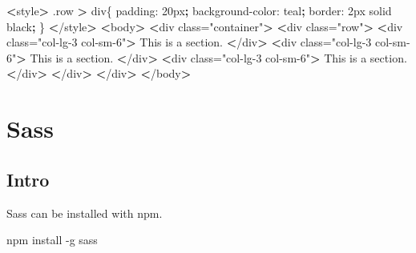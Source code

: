 \documentclass[]{book}
\newenvironment{Shaded}{\begin{snugshade}}{\end{snugshade}}
\newcommand{\ExtensionTok}[1]{#1}
\newcommand{\KeywordTok}[1]{\textcolor[rgb]{0.13,0.29,0.53}{\textbf{#1}}}
\newcommand{\NormalTok}[1]{#1}
\newcommand{\OperatorTok}[1]{\textcolor[rgb]{0.81,0.36,0.00}{\textbf{#1}}}
\newcommand{\StringTok}[1]{\textcolor[rgb]{0.31,0.60,0.02}{#1}}
\begin{document}
\begin{Shaded}
\begin{Highlighting}[]
\OperatorTok{<}\ExtensionTok{style}\OperatorTok{>}
    \ExtensionTok{.row} \OperatorTok{>}\NormalTok{ div\{}
        \ExtensionTok{padding}\NormalTok{: 20px}\KeywordTok{;}
        \ExtensionTok{background-color}\NormalTok{: teal}\KeywordTok{;}
        \ExtensionTok{border}\NormalTok{: 2px solid black}\KeywordTok{;}
\NormalTok{    \}}
\OperatorTok{<}\NormalTok{/}\ExtensionTok{style}\OperatorTok{>}
\OperatorTok{<}\ExtensionTok{body}\OperatorTok{>}
    \OperatorTok{<}\ExtensionTok{div}\NormalTok{ class=}\StringTok{"container"}\OperatorTok{>}
        \OperatorTok{<}\ExtensionTok{div}\NormalTok{ class=}\StringTok{"row"}\OperatorTok{>}
            \OperatorTok{<}\ExtensionTok{div}\NormalTok{ class=}\StringTok{"col-lg-3 col-sm-6"}\OperatorTok{>}
                \ExtensionTok{This}\NormalTok{ is a section.}
            \OperatorTok{<}\NormalTok{/}\ExtensionTok{div}\OperatorTok{>}
            \OperatorTok{<}\ExtensionTok{div}\NormalTok{ class=}\StringTok{"col-lg-3 col-sm-6"}\OperatorTok{>}
                \ExtensionTok{This}\NormalTok{ is a section.}
            \OperatorTok{<}\NormalTok{/}\ExtensionTok{div}\OperatorTok{>}
            \OperatorTok{<}\ExtensionTok{div}\NormalTok{ class=}\StringTok{"col-lg-3 col-sm-6"}\OperatorTok{>}
                \ExtensionTok{This}\NormalTok{ is a section.}
            \OperatorTok{<}\NormalTok{/}\ExtensionTok{div}\OperatorTok{>}
        \OperatorTok{<}\NormalTok{/}\ExtensionTok{div}\OperatorTok{>}
    \OperatorTok{<}\NormalTok{/}\ExtensionTok{div}\OperatorTok{>}
\OperatorTok{<}\NormalTok{/}\ExtensionTok{body}\OperatorTok{>}
\end{Highlighting}
\end{Shaded}

\hypertarget{sass}{%
\chapter{Sass}\label{sass}}

\hypertarget{intro}{%
\section{Intro}\label{intro}}

Sass can be installed with npm.

\begin{Shaded}
\begin{Highlighting}[]
\ExtensionTok{npm}\NormalTok{ install -g sass}
\end{Highlighting}
\end{Shaded}
\end{document}
